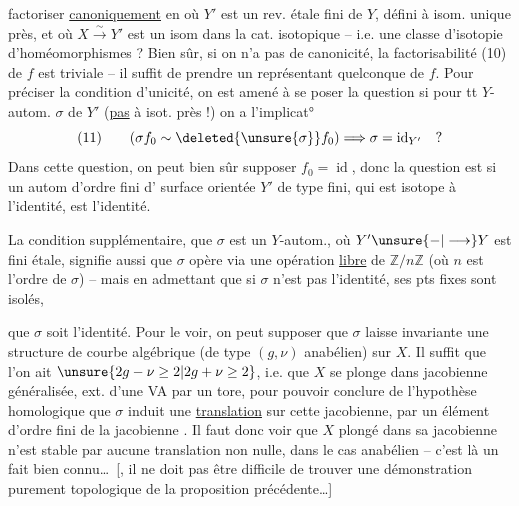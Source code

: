 factoriser \uline{canoniquement} en
où $Y'$ est un rev. étale fini de $Y$, défini à isom. unique près, et où $X\xrightarrow{\sim}Y'$ est un isom dans la cat. isotopique -- i.e. une classe d'isotopie d'homéomorphismes ? Bien sûr, si on n'a pas  de canonicité, la factorisabilité (10) de $f$ est triviale -- il suffit de prendre un représentant quelconque de $f$.  Pour préciser la  condition d'unicité, on est amené à se poser la question si pour tt $Y$-autom.  $\sigma$ de $Y'$  (\uline{pas} à isot. près !)  on a l'implicat°
\[
(11)\qquad (\sigma f_0\sim\deleted{\unsure{\sigma}}f_0)\Longrightarrow\sigma=\operatorname{id}_{Y'}\quad ?
\]
Dans cette question, on peut bien sûr supposer $f_0=\operatorname{id}$, donc la question est si un autom d'ordre fini \inserted{$\sigma$} d'  surface orientée $Y'$ de type fini, qui est isotope à l'identité, est l'identité.

La condition supplémentaire, que $\sigma$ est un $Y$-autom., où $Y'\unsure{-|\longrightarrow}Y$ est fini étale, signifie aussi que $\sigma$ opère via une opération \uline{libre} de $\mathbb{Z}/n\mathbb{Z}$ (où $n$ est l'ordre de $\sigma$) -- mais en admettant que si $\sigma$  n'est pas l'identité, ses pts fixes sont isolés,

que $\sigma$ soit l'identité. Pour le voir, on peut supposer que $\sigma$ laisse invariante une structure  de courbe algébrique (de type $(g,\nu)$ anabélien) sur $X$. Il suffit  que l'on ait $\unsure{2g-\nu\geq2|2g+\nu\geq2}$, i.e. que $X$ se plonge dans  jacobienne généralisée, ext. d'une VA par un tore, pour pouvoir conclure de l'hypothèse homologique que $\sigma$  induit une \uline{translation} sur cette jacobienne, par un élément d'ordre fini de la jacobienne . Il faut donc voir que $X$ plongé dans sa jacobienne n'est stable par aucune  translation non nulle, dans le cas anabélien -- c'est là un fait bien connu\ldots\ [, il ne doit pas être difficile de trouver une démonstration purement topologique de la proposition précédente\ldots]

